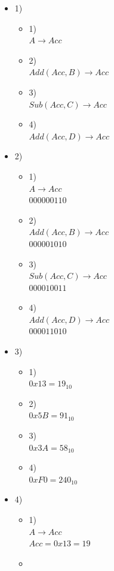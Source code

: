 \documentclass{article}
\begin{document}
\begin{itemize}
	\item
    1)
  \begin{itemize}
    \item
      1)\\
      $A\to Acc$
    \item
      2)\\
      $Add(Acc, B)\to Acc$
    \item
      3)\\
      $Sub(Acc, C)\to Acc$
    \item
      4)\\
      $Add(Acc, D)\to Acc$
  \end{itemize}
  \item
    2)
  \begin{itemize}
    \item
      1)\\
      $A\to Acc$\\
      $000000110$
    \item
      2)\\
      $Add(Acc, B)\to Acc$\\
      $000001010$
    \item
      3)\\
      $Sub(Acc, C)\to Acc$\\
      $000010011$
    \item
      4)\\
      $Add(Acc, D)\to Acc$\\
      $000011010$
  \end{itemize}
  \item
    3)
  \begin{itemize}
    \item
      1)\\
      $0x13 = 19_{10}$
    \item
      2)\\
      $0x5B = 91_{10}$
    \item
      3)\\
      $0x3A = 58_{10}$
    \item
      4)\\
      $0xF0 = 240_{10}$
  \end{itemize}
  \item
    4)
  \begin{itemize}
    \item
      1)\\
      $A\to Acc$\\
      $Acc=0x13=19$
    \item

\end{itemize}
\end{itemize}
\end{document}
